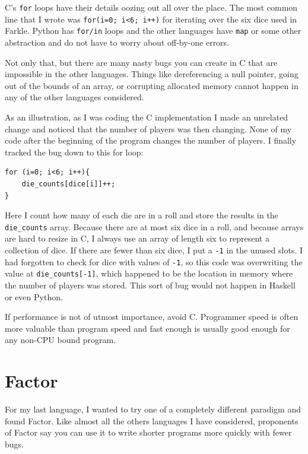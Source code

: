 \documentclass{article}
\begin{document}
C's \texttt{for} loops have their details oozing out all over the place.  The
most common line that I wrote was \texttt{for(i=0; i<6; i++)} for iterating over
the six dice used in Farkle.  Python has \texttt{for/in} loops and the other
languages have \texttt{map} or some other abstraction and do not have to worry
about off-by-one errors.

Not only that, but there are many nasty bugs you can create in C that are
impossible in the other languages.  Things like dereferencing a null pointer,
going out of the bounds of an array, or corrupting allocated memory cannot
happen in any of the other languages considered.

As an illustration, as I was coding the C implementation I made an unrelated
change and noticed that the number of players was then changing.  None of my
code after the beginning of the program changes the number of players.  I
finally tracked the bug down to this for loop:

\begin{verbatim}
for (i=0; i<6; i++){
    die_counts[dice[i]]++;
}
\end{verbatim}

Here I count how many of each die are in a roll and store the results in the
\texttt{die\_counts} array.  Because there are at most six dice in a roll, and
because arrays are hard to resize in C, I always use an array of length six to
represent a collection of dice.  If there are fewer than six dice, I put a
\texttt{-1} in the unused slots.  I had forgotten to check for dice with values
of \texttt{-1}, so this code was overwriting the value at
\texttt{die\_counts[-1]}, which happened to be the location in memory where the
number of players was stored.  This sort of bug would not happen in Haskell or
even Python.

If performance is not of utmost importance, avoid C.  Programmer speed is often
more valuable than program speed and fast enough is usually good enough for any
non-CPU bound program.

\section{Factor}

For my last language, I wanted to try one of a completely different paradigm and
found Factor.  Like almost all the others languages I have considered,
proponents of Factor say you can use it to write shorter programs more quickly
with fewer bugs.
\end{document}
